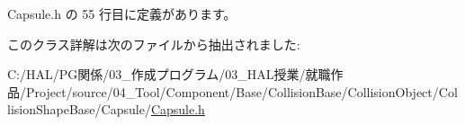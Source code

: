  Capsule.\+h の 55 行目に定義があります。



このクラス詳解は次のファイルから抽出されました\+:\begin{DoxyCompactItemize}
\item 
C\+:/\+H\+A\+L/\+P\+G関係/03\+\_\+作成プログラム/03\+\_\+\+H\+A\+L授業/就職作品/\+Project/source/04\+\_\+\+Tool/\+Component/\+Base/\+Collision\+Base/\+Collision\+Object/\+Collision\+Shape\+Base/\+Capsule/\mbox{\hyperlink{_capsule_8h}{Capsule.\+h}}\end{DoxyCompactItemize}
